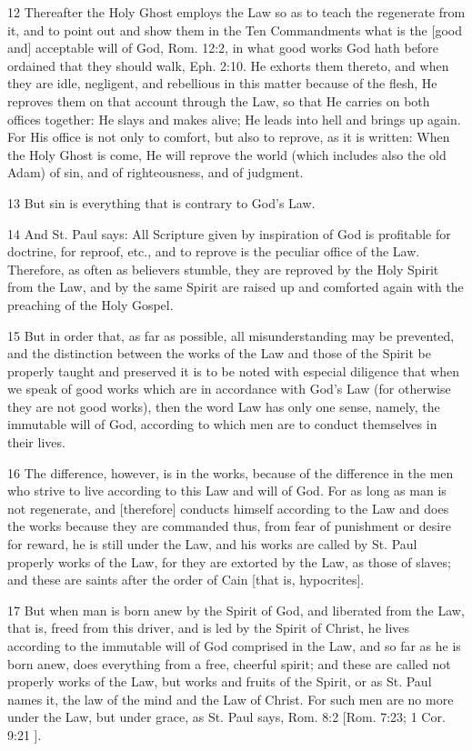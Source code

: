 12 Thereafter the Holy Ghost employs the Law so as to teach the regenerate from it, and to point out and show them in the Ten Commandments what is the [good and] acceptable will of God, Rom. 12:2, in what good works God hath before ordained that they should walk, Eph. 2:10. He exhorts them thereto, and when they are idle, negligent, and rebellious in this matter because of the flesh, He reproves them on that account through the Law, so that He carries on both offices together: He slays and makes alive; He leads into hell and brings up again. For His office is not only to comfort, but also to reprove, as it is written: When the Holy Ghost is come, He will reprove the world (which includes also the old Adam) of sin, and of righteousness, and of judgment.

13 But sin is everything that is contrary to God’s Law.

14 And St. Paul says: All Scripture given by inspiration of God is profitable for doctrine, for reproof, etc., and to reprove is the peculiar office of the Law. Therefore, as often as believers stumble, they are reproved by the Holy Spirit from the Law, and by the same Spirit are raised up and comforted again with the preaching of the Holy Gospel.

15 But in order that, as far as possible, all misunderstanding may be prevented, and the distinction between the works of the Law and those of the Spirit be properly taught and preserved it is to be noted with especial diligence that when we speak of good works which are in accordance with God’s Law (for otherwise they are not good works), then the word Law has only one sense, namely, the immutable will of God, according to which men are to conduct themselves in their lives.

16 The difference, however, is in the works, because of the difference in the men who strive to live according to this Law and will of God. For as long as man is not regenerate, and [therefore] conducts himself according to the Law and does the works because they are commanded thus, from fear of punishment or desire for reward, he is still under the Law, and his works are called by St. Paul properly works of the Law, for they are extorted by the Law, as those of slaves; and these are saints after the order of Cain [that is, hypocrites].

17 But when man is born anew by the Spirit of God, and liberated from the Law, that is, freed from this driver, and is led by the Spirit of Christ, he lives according to the immutable will of God comprised in the Law, and so far as he is born anew, does everything from a free, cheerful spirit; and these are called not properly works of the Law, but works and fruits of the Spirit, or as St. Paul names it, the law of the mind and the Law of Christ. For such men are no more under the Law, but under grace, as St. Paul says, Rom. 8:2 [Rom. 7:23; 1 Cor. 9:21 ].


